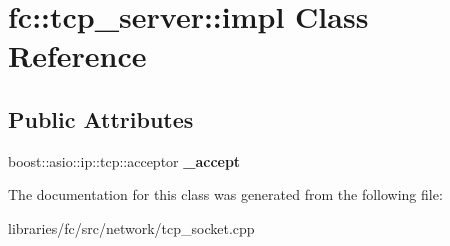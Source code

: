 \hypertarget{classfc_1_1tcp__server_1_1impl}{}\section{fc\+:\+:tcp\+\_\+server\+:\+:impl Class Reference}
\label{classfc_1_1tcp__server_1_1impl}
\subsection*{Public Attributes}
\begin{DoxyCompactItemize}
\item 
\mbox{\label{classfc_1_1tcp__server_1_1impl_a71f4bd92295ab55da6d74fd89e0b3f97}} 
boost\+::asio\+::ip\+::tcp\+::acceptor {\bfseries \+\_\+accept}
\end{DoxyCompactItemize}


The documentation for this class was generated from the following file\+:\begin{DoxyCompactItemize}
\item 
libraries/fc/src/network/tcp\+\_\+socket.\+cpp\end{DoxyCompactItemize}

